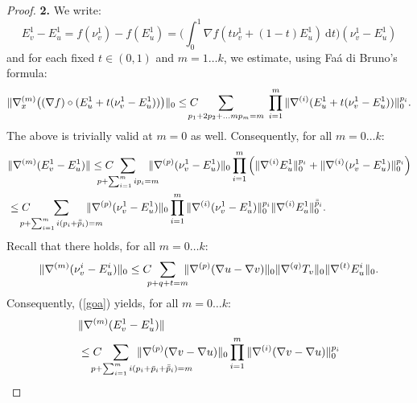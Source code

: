 \documentclass[reqno,twoside,11pt]{amsart}
\newcommand*{\dbar}[1]{\bar{\bar{#1}}}
\numberwithin{equation}{section}
\theoremstyle{plain}
\theoremstyle{definition}
\begin{document}
\begin{proof}
\smallskip

{\bf 2.} We write:
\begin{equation*}
E^1_v-E^1_u = f(\nu^1_v) - f(E^1_u) = \Big(\int_0^1\nabla
f(t\nu^1_v+(1-t)E^1_u)~\mbox{d}t\Big) (\nu^1_v-E^1_u) 
\end{equation*}
and for each fixed $t\in (0,1)$ and $m=1\ldots k$, we estimate,
using Fa\'a di Bruno's formula:
\begin{equation*}
\|\nabla^{(m)}_x\big((\nabla f)\circ(E_u^1+
t(\nu_v^1-E^1_u))\big)\|_0\leq C \hspace{-4mm}\sum_{p_1+2p_2+\ldots mp_m=m} \;
\prod_{i=1}^m\|\nabla^{(i)}(E_u^1+ t(\nu_v^1-E^1_u))\|_0^{p_i}.
\end{equation*}
The above is trivially valid at $m=0$ as well. Consequently, for all $m=0\ldots k$:
\begin{equation}\label{goa}
\begin{split}
&\|\nabla^{(m)}(E^1_v-E^1_u)\|\leq C \hspace{-6mm}\sum_{p+\sum_{i=1}^mip_i=m}
\hspace{-4mm}\|\nabla^{(p)}(\nu_v^1-E^1_u)\|_0 \prod_{i=1}^m\Big(\|\nabla^{(i)}E_u^1\|_0^{p_i}
+ \|\nabla^{(i)}(\nu_v^1-E^1_u)\|_0^{p_i}\Big)
\\ & \leq C \hspace{-4mm}\sum_{p+\sum_{i=1}^mi(p_i+\dbar p_i)=m}\hspace{-6mm}
\|\nabla^{(p)}(\nu_v^1-E^1_u)\|_0 \prod_{i=1}^m \|\nabla^{(i)}(\nu_v^1-E^1_u)\|_0^{p_i}
\|\nabla^{(i)}E_u^1\|_0^{\dbar p_i}.
\end{split}
\end{equation}
Recall that there holds, for all $m=0\ldots k$: 
\begin{equation}\label{b}
\|\nabla^{(m)}(\nu^i_v-E^i_u)\|_0 \leq C\hspace{-2mm}\sum_{p+q+t=m}\hspace{-2mm}
\|\nabla^{(p)}(\nabla u-\nabla v)\|_0 \|\nabla^{(q)}T_v\|_0  \|\nabla^{(t)}E^i_u\|_0.
\end{equation}
Consequently, (\ref{goa}) yields, for all $m=0\ldots k$:
\begin{equation}\label{goa2}
\begin{split}
&\|\nabla^{(m)}(E^1_v-E^1_u)\|\\ & \leq C \hspace{-4mm}
\sum_{p+\sum_{i=1}^mi(p_i+\bar p_i+\dbar p_i)=m\hspace{-13mm}}\hspace{-5mm}
\|\nabla^{(p)}(\nabla v -\nabla u)\|_0 \prod_{i=1}^m \|\nabla^{(i)}(\nabla v-\nabla u)\|_0^{p_i}

\end{split}
\end{equation}
\end{proof}
\end{document}
